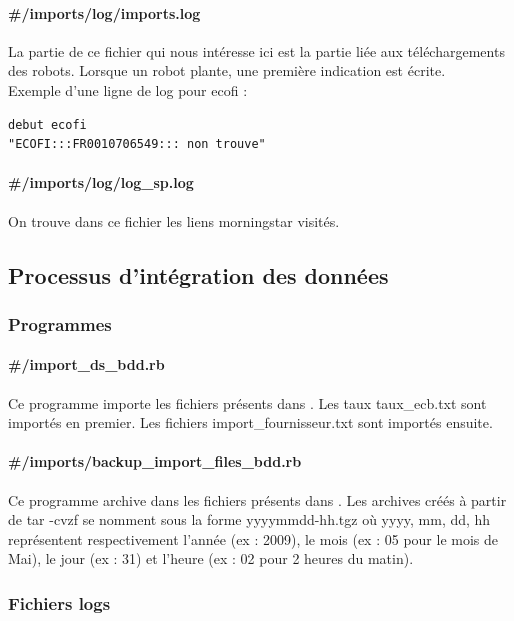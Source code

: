 \paragraph{{\#}/imports/log/imports.log}
La partie de ce fichier qui nous intéresse ici est la partie liée aux téléchargements des robots. Lorsque un robot plante, une première indication est écrite.\\
Exemple d'une ligne de log pour ecofi :
\begin{lstlisting}
debut ecofi
"ECOFI:::FR0010706549::: non trouve"
\end{lstlisting}
\paragraph{{\#}/imports/log/log{\_}sp.log}
On trouve dans ce fichier les liens morningstar visités.
\subsection{Processus d'intégration des données}
\subsubsection{Programmes}
\paragraph{{\#}/import{\_}ds{\_}bdd.rb}
Ce programme importe les fichiers présents dans . Les taux taux{\_}ecb.txt sont importés en premier. Les fichiers import{\_}fournisseur.txt sont importés ensuite.
\paragraph{{\#}/imports/backup{\_}import{\_}files{\_}bdd.rb}
Ce programme archive dans  les fichiers présents dans . Les archives créés à partir de {\og}tar -cvzf{\fg}  se nomment sous la forme yyyymmdd-hh.tgz où yyyy, mm, dd, hh représentent respectivement l'année (ex : 2009), le mois (ex : 05 pour le mois de Mai), le jour (ex : 31) et l'heure (ex : 02 pour 2 heures du matin).
\subsubsection{Fichiers logs}
